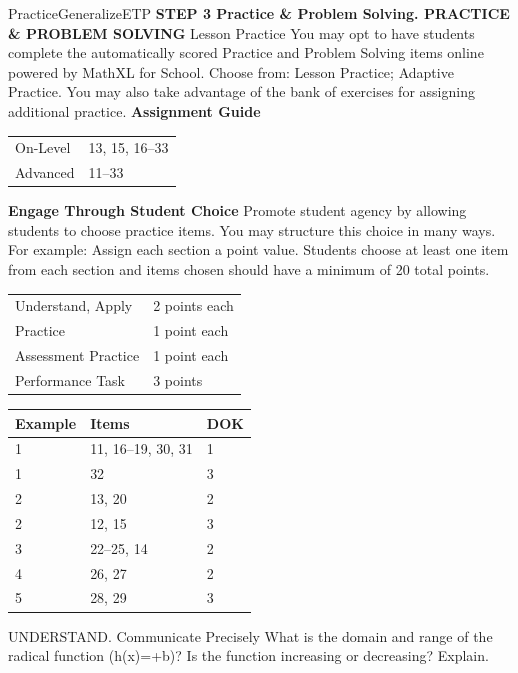 \documentclass{article}
\newenvironment{item-analysis}{}{}      %
\newenvironment{practice}[2]{}{}        %
\newenvironment{te-addendum}[2]{}{}     %
\newcommand{\answer}[1]{}               %
\newcommand{\te}[1]{}                   %
\begin{document}
\begin{te-addendum}{Practice}{GeneralizeETP}
\textbf{STEP 3 Practice \& Problem Solving. PRACTICE \& PROBLEM SOLVING}
Lesson Practice You may opt to have students complete the automatically scored Practice and Problem Solving items online powered by MathXL for School.
Choose from: Lesson Practice; Adaptive Practice.
You may also take advantage of the bank of exercises for assigning additional practice.
\textbf{Assignment Guide}
\begin{tabular}{ll}
On-Level & 13, 15, 16--33 \\
Advanced & 11--33 \\
\end{tabular}
\textbf{Engage Through Student Choice}
Promote student agency by allowing students to choose practice items. You may structure this choice in many ways.
For example:
Assign each section a point value. Students choose at least one item from each section and items chosen should have a minimum of 20 total points.
\begin{tabular}{ll}
Understand, Apply & 2 points each \\
Practice & 1 point each \\
Assessment Practice & 1 point each \\
Performance Task & 3 points \\
\end{tabular}
\te{Practice \& Problem Solving and video tutorials are available at SavvasRealize.com. Scan the QR code to access a video tutorial. Practice.}
\end{te-addendum}
\begin{item-analysis}
\begin{tabular}{lll}
\toprule
Example & Items & DOK \\
\midrule
1 & 11, 16--19, 30, 31 & 1 \\
1 & 32 & 3 \\
2 & 13, 20 & 2 \\
2 & 12, 15 & 3 \\
3 & 22--25, 14 & 2 \\
4 & 26, 27 & 2 \\
5 & 28, 29 & 3 \\
\bottomrule
\end{tabular}
\end{item-analysis}
\begin{practice}{11}{1}
UNDERSTAND. Communicate Precisely What is the domain and range of the radical function (h(x)=+b)? Is the function increasing or decreasing? Explain.
\answer{The graph of the radical function (h(x)=\sqrt{x+a}+b) is a shift (a) units left and (b) units up of the parent function (f(x)=\sqrt x), so the domain of (h(x)=\sqrt{x+a}+b) is (x\geq-a) and the range is (y\geq b). The function is increasing over the entire domain.}
\end{practice}
\end{document}
